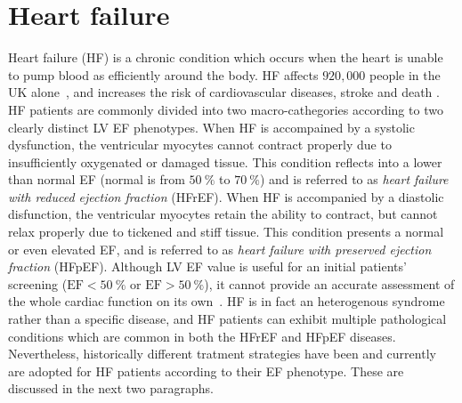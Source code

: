\section{Heart failure}\label{sec:ch1heart_failure}
Heart failure (\acs{HF}) is a chronic condition which occurs when the heart is unable to pump blood as efficiently around the body. HF affects $920,000$ people in the UK alone~\cite{Bhf:2021}, and increases the risk of cardiovascular diseases, stroke and death \cite{Adelborg:2017, Henkel:2008}. HF patients are commonly divided into two macro-cathegories according to two clearly distinct LV EF phenotypes. When HF is accompained by a systolic dysfunction, the ventricular myocytes cannot contract properly due to insufficiently oxygenated or damaged tissue. This condition reflects into a lower than normal EF (normal is from $\SI{50}{\percent}$ to $\SI{70}{\percent}$) and is referred to as \textit{heart failure with reduced ejection fraction} (\acs{HFrEF}). When HF is accompanied by a diastolic disfunction, the ventricular myocytes retain the ability to contract, but cannot relax properly due to tickened and stiff tissue. This condition presents a normal or even elevated EF, and is referred to as \textit{heart failure with preserved ejection fraction} (\acs{HFpEF}). Although LV EF value is useful for an initial patients' screening ($\textrm{EF}<\SI{50}{\percent}$ or $\textrm{EF}>\SI{50}{\percent}$), it cannot provide an accurate assessment of the whole cardiac function on its own~\cite{Guyton:2021}. HF is in fact an heterogenous syndrome rather than a specific disease, and HF patients can exhibit multiple pathological conditions which are common in both the HFrEF and HFpEF diseases. Nevertheless, historically different tratment strategies have been and currently are adopted for HF patients according to their EF phenotype. These are discussed in the next two paragraphs.



%
%
%
